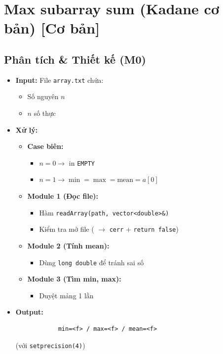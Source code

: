 \section{Max subarray sum (Kadane cơ bản) [Cơ bản]}
\subsection{Phân tích \& Thiết kế (M0)}
    \begin{itemize}
    \item \textbf{Input:}
    File \texttt{array.txt} chứa:
    \begin{itemize}
        \item Số nguyên $n$
        \item $n$ số thực
    \end{itemize}

    \item \textbf{Xử lý:}
        \begin{itemize}
            \item \textbf{Case biên:}
            \begin{itemize}
                \item $n = 0 \rightarrow$ in \texttt{EMPTY}
                \item $n = 1 \rightarrow \min = \max = \text{mean} = a[0]$
            \end{itemize}
            
            \item \textbf{Module 1 (Đọc file):}
            \begin{itemize}
                \item Hàm \texttt{readArray(path, vector<double>\&)}
                \item Kiểm tra mở file ( $\rightarrow$ \texttt{cerr} + \texttt{return false})
            \end{itemize}
            
            \item \textbf{Module 2 (Tính mean):}
            \begin{itemize}
                \item Dùng \texttt{long double} để tránh sai số
            \end{itemize}
            
            \item \textbf{Module 3 (Tìm min, max):}
            \begin{itemize}
                \item Duyệt mảng 1 lần
            \end{itemize}
        \end{itemize}

        \item \textbf{Output:}
        \begin{lstlisting}
            min=<f> / max=<f> / mean=<f>\end{lstlisting} 
        (với \texttt{setprecision(4)})
    \end{itemize}

